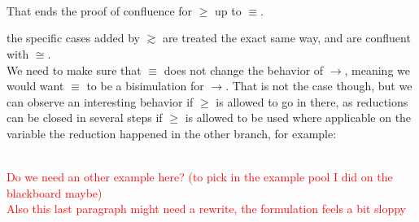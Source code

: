 \begin{myproof}
\\
\\~\\
That ends the proof of confluence for $\geq$ up to $\equiv$.
\end{myproof}

\remark the specific cases added by $\gtrsim$ are treated the exact same way, and are confluent with $\cong$.\\

We need to make sure that $\equiv$ does not change the behavior of $\to$, meaning we would want $\equiv$ to be a bisimulation for $\to$. That is not the case though, but we can observe an interesting behavior if $\geq$ is allowed to go in there, as reductions can be closed in several steps if $\geq$ is allowed to be used where applicable on the variable the reduction happened in the other branch, for example:

\\

\textcolor{red}{Do we need an other example here? (to pick in the example pool I did on the blackboard maybe)\\
Also this last paragraph might need a rewrite, the formulation feels a bit sloppy} %